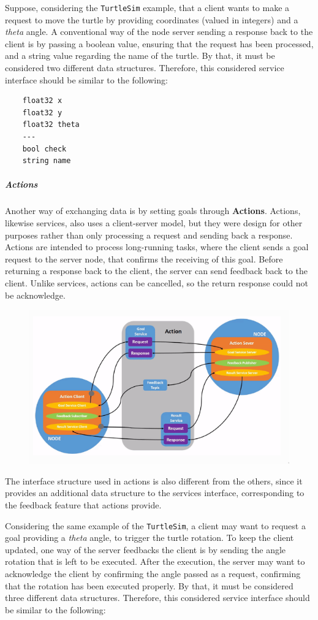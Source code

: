 Suppose, considering the \texttt{TurtleSim} example, that a client wants to make a request to move the turtle by providing coordinates (valued in integers) and a \textit{theta} angle. A conventional way of the node server sending a response back to the client is by passing a boolean value, ensuring that the request has been processed, and a string value regarding the name of the turtle. By that, it must be considered two different data structures. Therefore, this considered service interface should be similar to the following:

\begin{verbatim}
    float32 x
    float32 y
    float32 theta
    ---
    bool check
    string name
\end{verbatim}

\subparagraph{Actions}

Another way of exchanging data is by setting goals through \textbf{Actions}. Actions, likewise services, also uses a client-server model, but they were design for other purposes rather than only processing a request and sending back a response. Actions are intended to process long-running tasks, where the client sends a goal request to the server node, that confirms the receiving of this goal. Before returning a response back to the client, the server can send feedback back to the client. Unlike services, actions can be cancelled, so the return response could not be acknowledge. 

\begin{figure}[H]
    \centering
    \includegraphics[width=0.7\linewidth]{images/ros2-actions.png}
\end{figure}

The interface structure used in actions is also different from the others, since it provides an additional data structure to the services interface, corresponding to the feedback feature that actions provide.
                
Considering the same example of the \texttt{TurtleSim}, a client may want to request a goal providing a \textit{theta} angle, to trigger the turtle rotation. To keep the client updated, one way of the server feedbacks the client is by sending the angle rotation that is left to be executed. After the execution, the server may want to acknowledge the client by confirming the angle passed as a request, confirming that the rotation has been executed properly. By that, it must be considered three different data structures. Therefore, this considered service interface should be similar to the following:

